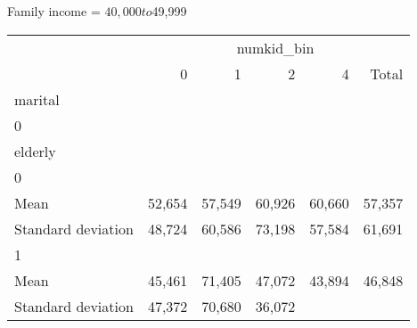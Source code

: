 Family income = $40,000 to $49,999
\begin{tabular}{llllll}
\cline{1-6}
\multicolumn{1}{c}{} &
  \multicolumn{5}{|c}{numkid\_bin} \\
\multicolumn{1}{c}{} &
  \multicolumn{1}{|r}{0} &
  \multicolumn{1}{r}{1} &
  \multicolumn{1}{r}{2} &
  \multicolumn{1}{r}{4} &
  \multicolumn{1}{r}{Total} \\
\cline{1-6}
\multicolumn{1}{l}{marital} &
  \multicolumn{1}{|r}{} &
  \multicolumn{1}{r}{} &
  \multicolumn{1}{r}{} &
  \multicolumn{1}{r}{} &
  \multicolumn{1}{r}{} \\
\multicolumn{1}{l}{\hspace{1em}0} &
  \multicolumn{1}{|r}{} &
  \multicolumn{1}{r}{} &
  \multicolumn{1}{r}{} &
  \multicolumn{1}{r}{} &
  \multicolumn{1}{r}{} \\
\multicolumn{1}{l}{\hspace{2em}elderly} &
  \multicolumn{1}{|r}{} &
  \multicolumn{1}{r}{} &
  \multicolumn{1}{r}{} &
  \multicolumn{1}{r}{} &
  \multicolumn{1}{r}{} \\
\multicolumn{1}{l}{\hspace{3em}0} &
  \multicolumn{1}{|r}{} &
  \multicolumn{1}{r}{} &
  \multicolumn{1}{r}{} &
  \multicolumn{1}{r}{} &
  \multicolumn{1}{r}{} \\
\multicolumn{1}{l}{\hspace{4em}Mean} &
  \multicolumn{1}{|r}{52,654} &
  \multicolumn{1}{r}{57,549} &
  \multicolumn{1}{r}{60,926} &
  \multicolumn{1}{r}{60,660} &
  \multicolumn{1}{r}{57,357} \\
\multicolumn{1}{l}{\hspace{4em}Standard deviation} &
  \multicolumn{1}{|r}{48,724} &
  \multicolumn{1}{r}{60,586} &
  \multicolumn{1}{r}{73,198} &
  \multicolumn{1}{r}{57,584} &
  \multicolumn{1}{r}{61,691} \\
\multicolumn{1}{l}{\hspace{3em}1} &
  \multicolumn{1}{|r}{} &
  \multicolumn{1}{r}{} &
  \multicolumn{1}{r}{} &
  \multicolumn{1}{r}{} &
  \multicolumn{1}{r}{} \\
\multicolumn{1}{l}{\hspace{4em}Mean} &
  \multicolumn{1}{|r}{45,461} &
  \multicolumn{1}{r}{71,405} &
  \multicolumn{1}{r}{47,072} &
  \multicolumn{1}{r}{43,894} &
  \multicolumn{1}{r}{46,848} \\
\multicolumn{1}{l}{\hspace{4em}Standard deviation} &
  \multicolumn{1}{|r}{47,372} &
  \multicolumn{1}{r}{70,680} &
  \multicolumn{1}{r}{36,072} &

\end{tabular}
